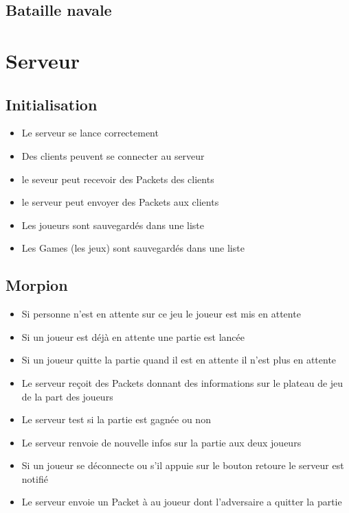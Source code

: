 \documentclass{report}
\begin{document}
\subsection{Bataille navale}


\section{Serveur}

\subsection{Initialisation}
\begin{itemize}
  \item Le serveur se lance correctement
  \item Des clients peuvent se connecter au serveur
  \item le seveur peut recevoir des Packets des clients
  \item le serveur peut envoyer des Packets aux clients
  \item Les joueurs sont sauvegardés dans une liste
  \item Les Games (les jeux) sont sauvegardés dans une liste
\end{itemize}

\subsection{Morpion}
\begin{itemize}
  \item Si personne n'est en attente sur ce jeu le joueur est mis en attente
  \item Si un joueur est déjà en attente une partie est lancée
  \item Si un joueur quitte la partie quand il est en attente il n'est plus en attente
  \item Le serveur reçoit des Packets donnant des informations sur le plateau de jeu de la part des joueurs
  \item Le serveur test si la partie est gagnée ou non
  \item Le serveur renvoie de nouvelle infos sur la partie aux deux joueurs
  \item Si un joueur se déconnecte ou s'il appuie sur le bouton retoure le serveur est notifié
  \item Le serveur envoie un Packet à au joueur dont l'adversaire a quitter la partie
\end{itemize}
\end{document}
